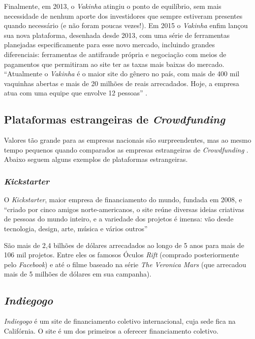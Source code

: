 \documentclass{classe_cn}                 %
\begin{document}
Finalmente, em 2013, o \textit{Vakinha} atingiu o ponto de equilíbrio, sem mais necessidade de nenhum aporte dos investidores que sempre estiveram presentes quando necessário (e não foram poucas vezes!). Em 2015 o \textit{Vakinha} enfim lançou sua nova plataforma, desenhada desde 2013, com uma série de ferramentas planejadas especificamente para esse novo mercado, incluindo grandes diferenciais: ferramentas de antifraude própria e negociação com meios de pagamentos que permitiram ao site ter as taxas mais baixas do mercado. “Atualmente o \textit{Vakinha} é o maior site do gênero no país, com mais de 400 mil vaquinhas abertas e mais de 20 milhões de reais arrecadados. Hoje, a empresa atua com uma equipe que envolve 12 pessoas”  \cite{VAKINHA:2017}.

\subsection{Plataformas estrangeiras de \textit{Crowdfunding}}

Valores tão grande para as empresas nacionais são surpreendentes, mas ao mesmo tempo pequenos quando comparados as empresas estrangeiras de \textit{Crowdfunding} . Abaixo seguem alguns exemplos de plataformas estrangeiras.

\subsubsection{\textit{Kickstarter}}

O \textit{Kickstarter}, maior empresa de financiamento do mundo, fundada em 2008, e “criado por cinco amigos norte-americanos, o site reúne diversas ideias criativas de pessoas do mundo inteiro, e a variedade dos projetos é imensa: vão desde tecnologia, design, arte, música e vários outros” \cite{CANALTECH:2017}

São mais de 2,4 bilhões de dólares arrecadados ao longo de 5 anos para mais de 106 mil projetos. Entre eles os famosos Óculos \textit{Rift} (comprado posteriormente pelo \textit{Facebook}) e até o filme baseado na série \textit{The Veronica Mars} (que arrecadou mais de 5 milhões de dólares em sua campanha).

\subsection{\textit{Indiegogo}}

\textit{Indiegogo} é um site de financiamento coletivo internacional, cuja sede fica na Califórnia. O site é um dos primeiros a oferecer financiamento coletivo.
\end{document}

